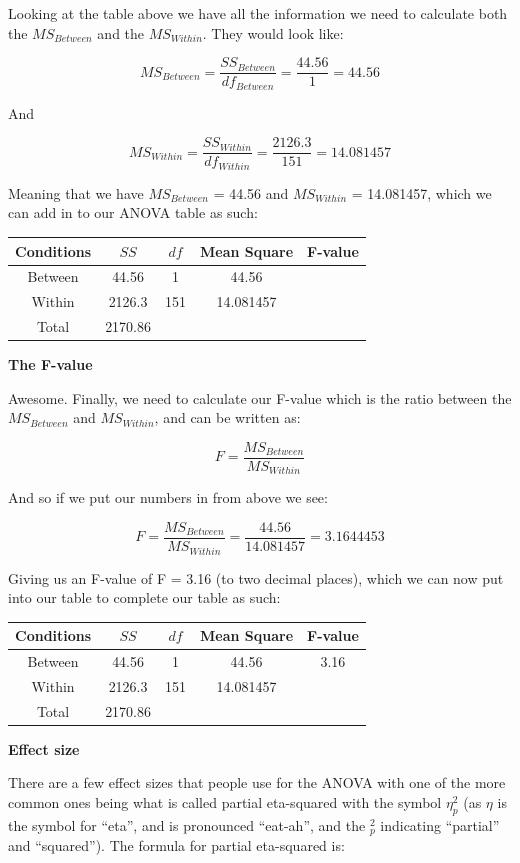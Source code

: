\documentclass[
  oneside]{book}
\begin{document}
Looking at the table above we have all the information we need to calculate both the \(MS_{Between}\) and the \(MS_{Within}\). They would look like:

\[MS_{Between} = \frac{SS_{Between}}{df_{Between}} = \frac{44.56}{1} = 44.56\]

And

\[MS_{Within} = \frac{SS_{Within}}{df_{Within}} = \frac{2126.3}{151} = 14.081457\]

Meaning that we have \(MS_{Between}\) = 44.56 and \(MS_{Within}\) = 14.081457, which we can add in to our ANOVA table as such:

\begin{longtable}[]{@{}ccccc@{}}
\toprule
Conditions & \(SS\) & \(df\) & Mean Square & F-value \\
\midrule
\endhead
Between & 44.56 & 1 & 44.56 & \\
Within & 2126.3 & 151 & 14.081457 & \\
Total & 2170.86 & & & \\
\bottomrule
\end{longtable}

\textbf{The F-value}

Awesome. Finally, we need to calculate our F-value which is the ratio between the \(MS_{Between}\) and \(MS_{Within}\), and can be written as:

\[F = \frac{MS_{Between}}{MS_{Within}}\]

And so if we put our numbers in from above we see:

\[F = \frac{MS_{Between}}{MS_{Within}} = \frac{44.56}{14.081457} = 3.1644453\]

Giving us an F-value of F = 3.16 (to two decimal places), which we can now put into our table to complete our table as such:

\begin{longtable}[]{@{}ccccc@{}}
\toprule
Conditions & \(SS\) & \(df\) & Mean Square & F-value \\
\midrule
\endhead
Between & 44.56 & 1 & 44.56 & 3.16 \\
Within & 2126.3 & 151 & 14.081457 & \\
Total & 2170.86 & & & \\
\bottomrule
\end{longtable}

\textbf{Effect size}

There are a few effect sizes that people use for the ANOVA with one of the more common ones being what is called partial eta-squared with the symbol \(\eta_p^2\) (as \(\eta\) is the symbol for ``eta'', and is pronounced ``eat-ah'', and the \(_p^2\) indicating ``partial'' and ``squared''). The formula for partial eta-squared is:
\end{document}

